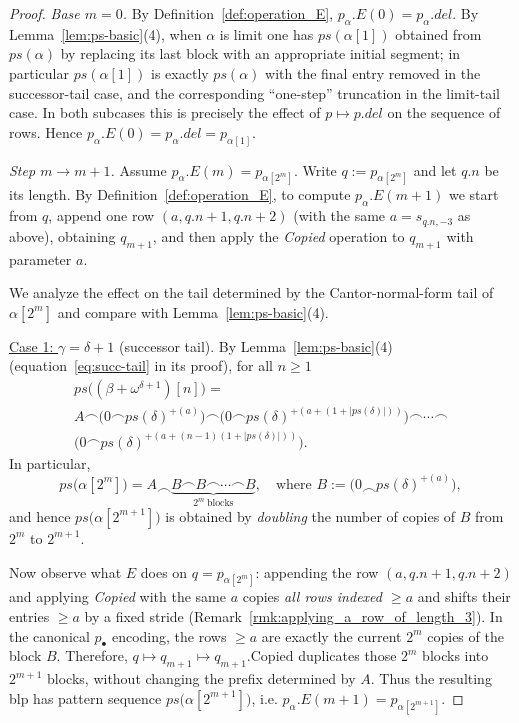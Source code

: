 \documentclass{article}
\theoremstyle{definition}
\theoremstyle{remark}
\begin{document}
\begin{proof}
\emph{Base $m=0$.}
By Definition~\ref{def:operation_E}, $p_\alpha.E(0)=p_\alpha.del$.
By Lemma~\ref{lem:ps-basic}(4), when $\alpha$ is limit one has
\(
ps(\alpha[1])
\)
obtained from $ps(\alpha)$ by replacing its last block with an appropriate initial
segment; in particular $ps(\alpha[1])$ is exactly $ps(\alpha)$ with the final entry
removed in the successor-tail case, and the corresponding ``one-step'' truncation in
the limit-tail case. In both subcases this is precisely the effect of $p\mapsto p.del$
on the sequence of rows. Hence $p_\alpha.E(0)=p_\alpha.del=p_{\alpha[1]}$.

\emph{Step $m\to m+1$.}
Assume $p_\alpha.E(m)=p_{\alpha[2^m]}$. Write $q:=p_{\alpha[2^m]}$ and let
$q.n$ be its length. By Definition~\ref{def:operation_E}, to compute $p_\alpha.E(m+1)$
we start from $q$, append one row $(a,q.n+1,q.n+2)$ (with the same $a=s_{q.n,-3}$ as
above), obtaining $q_{m+1}$, and then apply the \textit{Copied} operation to $q_{m+1}$
with parameter $a$.

We analyze the effect on the tail determined by the Cantor-normal-form tail of
$\alpha[2^m]$ and compare with Lemma~\ref{lem:ps-basic}(4).

\underline{Case 1: } $\gamma=\delta+1$ (successor tail).
By Lemma~\ref{lem:ps-basic}(4) (equation~\eqref{eq:succ-tail} in its proof), for all $n\ge1$
\begin{multline*}
  ps\!\bigl((\beta+\omega^{\delta+1})[n]\bigr)
= \\ A \frown \bigl(0\frown ps(\delta)^{+(a)}\bigr)
      \frown \bigl(0\frown ps(\delta)^{+(a+(1+|ps(\delta)|))}\bigr)
      \frown \cdots \frown \\ 
      \bigl(0\frown ps(\delta)^{+(a+(n-1)(1+|ps(\delta)|))}\bigr).
\end{multline*}
In particular,
\[
ps\!\bigl(\alpha[2^m]\bigr)=A\frown \underbrace{B \frown B \frown\cdots \frown B}_{2^m\ \text{blocks}},
\quad\text{where }B:=\bigl(0\frown ps(\delta)^{+(a)}\bigr),
\]
and hence $ps\!\bigl(\alpha[2^{m+1}]\bigr)$ is obtained by \emph{doubling} the number
of copies of $B$ from $2^m$ to $2^{m+1}$.

Now observe what $E$ does on $q=p_{\alpha[2^m]}$:
appending the row $(a,q.n+1,q.n+2)$ and applying \textit{Copied} with the same $a$
copies \emph{all rows indexed $\ge a$} and shifts their entries $\ge a$ by a fixed
stride (Remark~\ref{rmk:applying_a_row_of_length_3}). In the canonical $p_\bullet$
encoding, the rows $\ge a$ are exactly the current $2^m$ copies of the block $B$.
Therefore, $q\mapsto q_{m+1}\mapsto q_{m+1}.\mathrm{Copied}$ duplicates those $2^m$
blocks into $2^{m+1}$ blocks, without changing the prefix determined by $A$.
Thus the resulting blp has pattern sequence $ps\!\bigl(\alpha[2^{m+1}]\bigr)$, i.e.
$p_\alpha.E(m+1)=p_{\alpha[2^{m+1}]}$.


\end{proof}
\end{document}
